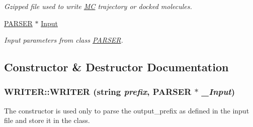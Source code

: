 \begin{DoxyCompactItemize}
\begin{DoxyCompactList}\small\item\em Gzipped file used to write \hyperlink{classMC}{MC} trajectory or docked molecules. \item\end{DoxyCompactList}\item 
\hypertarget{classWRITER_aa4434d97fabf3182b0ea387f76508695}{
\hyperlink{classPARSER}{PARSER} $\ast$ \hyperlink{classWRITER_aa4434d97fabf3182b0ea387f76508695}{Input}}
\label{classWRITER_aa4434d97fabf3182b0ea387f76508695}

\begin{DoxyCompactList}\small\item\em Input parameters from class \hyperlink{classPARSER}{PARSER}. \item\end{DoxyCompactList}\end{DoxyCompactItemize}


\subsection{Constructor \& Destructor Documentation}
\hypertarget{classWRITER_a307cdce6b130bef1464f6314c282357a}{
\subsubsection[{WRITER}]{\setlength{\rightskip}{0pt plus 5cm}WRITER::WRITER (string {\em prefix}, \/  {\bf PARSER} $\ast$ {\em \_\-Input})}}
\label{classWRITER_a307cdce6b130bef1464f6314c282357a}
The constructor is used only to parse the output\_\-prefix as defined in the input file and store it in the class. 

